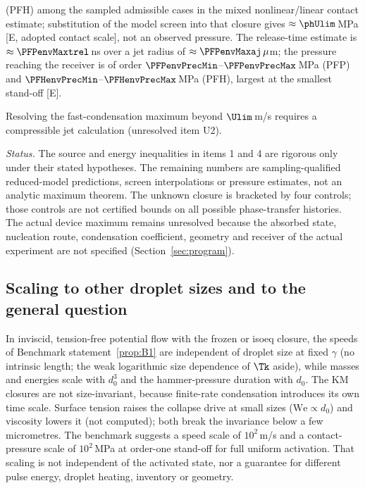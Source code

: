 \begin{benchmark}
\begin{enumerate}[leftmargin=*]
(PFH) among the sampled admissible cases in the mixed nonlinear/linear contact estimate;
substitution of the model screen into that closure gives $\approx\phUlim$\,MPa
\textup{[E, adopted contact scale]}, not an observed pressure.
The release-time estimate is $\approx\PFPenvMaxtrel$\,ns over a jet radius of $\approx\PFPenvMaxaj\,\mu$m; the pressure
reaching the receiver is of order $\PFPenvPrecMin$--$\PFPenvPrecMax$\,MPa (PFP) and $\PFHenvPrecMin$--$\PFHenvPrecMax$\,MPa
(PFH), largest at the smallest stand-off \textup{[E]}.
\end{enumerate}
Resolving the fast-condensation maximum beyond $\Ulim$\,m/s requires a compressible jet calculation (unresolved item U2).
\end{benchmark}
\emph{Status.} The source and energy inequalities in items 1 and 4 are rigorous only under their
stated hypotheses. The remaining numbers are sampling-qualified reduced-model predictions,
screen interpolations or pressure estimates, not an analytic maximum theorem. The unknown closure
is bracketed by four controls; those controls are not certified bounds on all possible phase-transfer histories.
The actual device maximum remains unresolved because the absorbed state, nucleation route,
condensation coefficient, geometry and receiver of the actual experiment are not specified
(Section~\ref{sec:program}).

\subsection{Scaling to other droplet sizes and to the general question}
In inviscid, tension-free potential flow with the frozen or isoeq closure, the speeds of Benchmark statement~\ref{prop:B1}
are independent of droplet size at fixed $\gamma$ (no intrinsic length; the weak logarithmic size dependence of
$\Tk$ aside), while masses and energies scale with $d_0^3$ and the hammer-pressure duration with $d_0$. The KM
closures are not size-invariant, because finite-rate condensation introduces its own time scale. Surface tension raises the collapse drive at small sizes
($\mathrm{We}\propto d_0$) and viscosity lowers it (not computed); both break the invariance below a few
micrometres. The benchmark suggests a speed scale of $10^2$\,m/s and a contact-pressure scale of
$10^2$\,MPa at order-one stand-off for full uniform activation. That scaling is not independent of
the activated state, nor a guarantee for different pulse energy, droplet heating, inventory or geometry.

